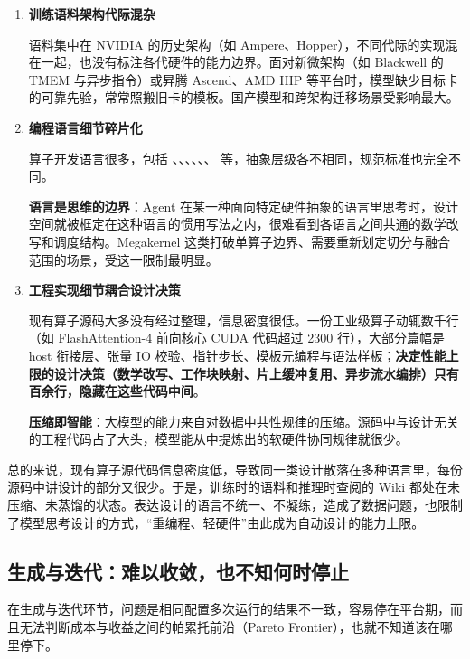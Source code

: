 \begin{enumerate}[start=1]
\item
\textbf{训练语料架构代际混杂}


语料集中在 NVIDIA 的历史架构（如 Ampere、Hopper），不同代际的实现混在一起，也没有标注各代硬件的能力边界。面对新微架构（如 Blackwell 的 TMEM 与异步指令）或昇腾 Ascend、AMD HIP 等平台时，模型缺少目标卡的可靠先验，常常照搬旧卡的模板。国产模型和跨架构迁移场景受影响最大。


\item
\textbf{编程语言细节碎片化}


算子开发语言很多，包括 、、、、、、 等，抽象层级各不相同，规范标准也完全不同。

\textbf{语言是思维的边界}：Agent 在某一种面向特定硬件抽象的语言里思考时，设计空间就被框定在这种语言的惯用写法之内，很难看到各语言之间共通的数学改写和调度结构。Megakernel 这类打破单算子边界、需要重新划定切分与融合范围的场景，受这一限制最明显。


\item
\textbf{工程实现细节耦合设计决策}


现有算子源码大多没有经过整理，信息密度很低。一份工业级算子动辄数千行（如 FlashAttention-4 前向核心 CUDA 代码超过 2300 行），大部分篇幅是 host 衔接层、张量 IO 校验、指针步长、模板元编程与语法样板；\textbf{决定性能上限的设计决策（数学改写、工作块映射、片上缓冲复用、异步流水编排）只有百余行，隐藏在这些代码中间}。

\textbf{压缩即智能}：大模型的能力来自对数据中共性规律的压缩。源码中与设计无关的工程代码占了大头，模型能从中提炼出的软硬件协同规律就很少。


\end{enumerate}

总的来说，现有算子源代码信息密度低，导致同一类设计散落在多种语言里，每份源码中讲设计的部分又很少。于是，训练时的语料和推理时查阅的 Wiki 都处在未压缩、未蒸馏的状态。表达设计的语言不统一、不凝练，造成了数据问题，也限制了模型思考设计的方式，“重编程、轻硬件”由此成为自动设计的能力上限。

\newpage

\subsection{生成与迭代：难以收敛，也不知何时停止}\label{sec:challenge-iteration}
在生成与迭代环节，问题是相同配置多次运行的结果不一致，容易停在平台期，而且无法判断成本与收益之间的帕累托前沿（Pareto Frontier），也就不知道该在哪里停下。


